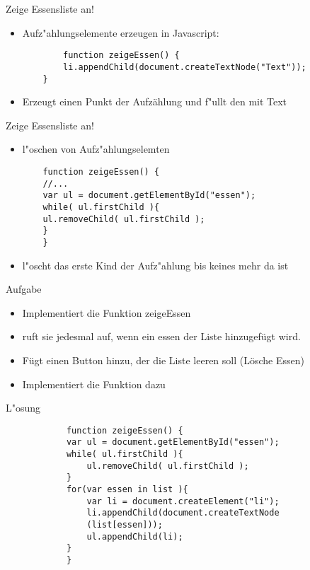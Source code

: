 \documentclass[18pt]{beamer}
\begin{document}
\begin{frame}[fragile]{Zeige Essensliste an!}
\begin{itemize}
	\item Aufz"ahlungselemente erzeugen in Javascript: 
	\begin{lstlisting}
		function zeigeEssen() {
		li.appendChild(document.createTextNode("Text"));
	}
	\end{lstlisting}
	\item Erzeugt einen Punkt der Aufzählung und f"ullt den mit Text
\end{itemize}
\end{frame}


\begin{frame}[fragile]{Zeige Essensliste an!}
\begin{itemize}
	\item l"oschen von Aufz"ahlungselemten
	\begin{lstlisting}
	function zeigeEssen() {
	//...
	var ul = document.getElementById("essen");
	while( ul.firstChild ){
	ul.removeChild( ul.firstChild );
	}
	}
	\end{lstlisting}
	\item l"oscht das erste Kind der Aufz"ahlung bis keines mehr da ist
\end{itemize}

\end{frame}

\begin{frame}[fragile]{Aufgabe}
\begin{itemize}
	\item Implementiert die Funktion zeigeEssen
	\item ruft sie jedesmal auf, wenn ein essen der Liste hinzugefügt wird.
	\item Fügt einen Button hinzu, der die Liste leeren soll (Lösche Essen)
	\item Implementiert die Funktion dazu
\end{itemize}
\end{frame}

\begin{frame}[fragile]{L"osung}
		\begin{lstlisting}
			function zeigeEssen() {
			var ul = document.getElementById("essen");
			while( ul.firstChild ){
				ul.removeChild( ul.firstChild );
			}
			for(var essen in list ){
				var li = document.createElement("li");
				li.appendChild(document.createTextNode
				(list[essen]));
				ul.appendChild(li);
			}
			}
		\end{lstlisting}
\end{frame}
\end{document}
